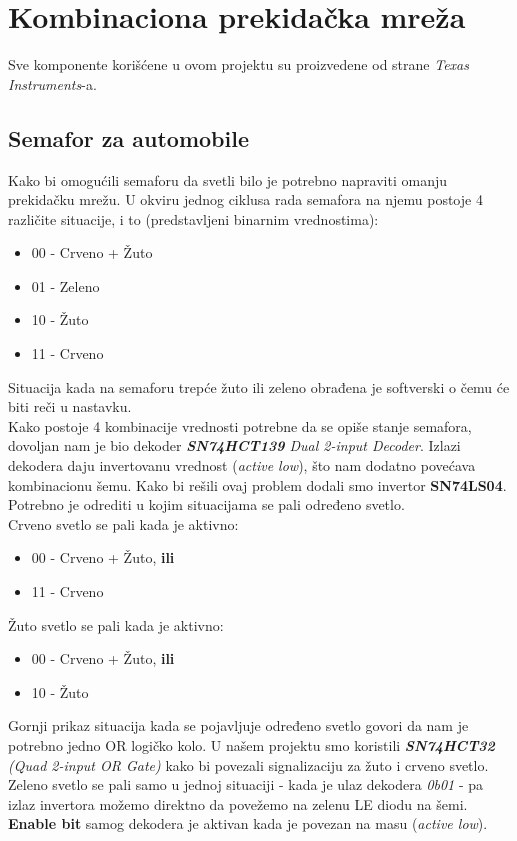 \documentclass[a4paper,12pt, projekat]{etf}
\begin{document}
\section{Kombinaciona prekidačka mreža}
Sve komponente korišćene u ovom projektu su proizvedene od strane \textit{Texas Instruments}-a.

\subsection{Semafor za automobile}
Kako bi omogućili semaforu da svetli bilo je potrebno napraviti omanju prekidačku mrežu. U okviru jednog ciklusa rada semafora na njemu postoje 4 različite situacije, i to (predstavljeni binarnim vrednostima):
\begin{itemize}
  \item 00 - Crveno + Žuto
  \item 01 - Zeleno
  \item 10 - Žuto
  \item 11 - Crveno
\end{itemize}
Situacija kada na semaforu trepće žuto ili zeleno obrađena je softverski o čemu će biti reči u nastavku.\\
Kako postoje 4 kombinacije vrednosti potrebne da se opiše stanje semafora, dovoljan nam je bio dekoder \textit{\textbf{SN74HCT139} Dual 2-input Decoder}.
Izlazi dekodera daju invertovanu vrednost (\textit{active low}), što nam dodatno povećava kombinacionu šemu. Kako bi rešili ovaj problem dodali smo invertor \textbf{SN74LS04}.\\
Potrebno je odrediti u kojim situacijama se pali određeno svetlo.\\
Crveno svetlo se pali kada je aktivno:
\begin{itemize}
  \item 00 - Crveno + Žuto, \textbf{ili}
  \item 11 - Crveno
\end{itemize}
Žuto svetlo se pali kada je aktivno:
\begin{itemize}
  \item 00 - Crveno + Žuto, \textbf{ili}
  \item 10 - Žuto
\end{itemize}
Gornji prikaz situacija kada se pojavljuje određeno svetlo govori da nam je potrebno jedno OR logičko kolo. U našem projektu smo koristili \textit{\textbf{SN74HCT32} (Quad 2-input OR Gate)} kako bi povezali signalizaciju za žuto i crveno svetlo. Zeleno svetlo se pali samo u jednoj situaciji - kada je ulaz dekodera \textit{0b01} - pa izlaz invertora možemo direktno da povežemo na zelenu LE diodu na šemi.
\textbf{Enable bit} samog dekodera je aktivan kada je povezan na masu (\textit{active low}).
\end{document}
